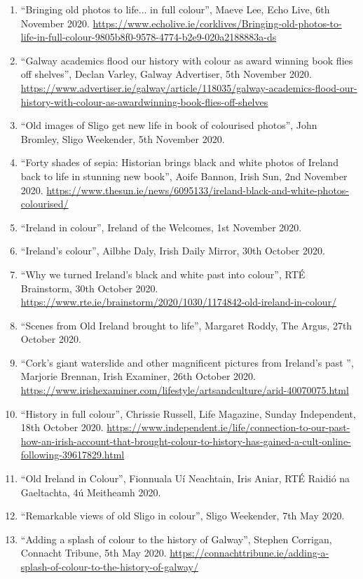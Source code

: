 \documentclass[10pt,a4paper]{res} %
\begin{document}
\begin{resume}
{\begin{enumerate}
\item ``Bringing old photos to life... in full colour'', Maeve Lee, Echo Live, 6th November 2020. \url{https://www.echolive.ie/corklives/Bringing-old-photos-to-life-in-full-colour-9805b8f0-9578-4774-b2e9-020a2188883a-ds}
\item ``Galway academics flood our history with colour as award winning book flies off shelves'', Declan Varley, Galway Advertiser, 5th November 2020. \url{https://www.advertiser.ie/galway/article/118035/galway-academics-flood-our-history-with-colour-as-awardwinning-book-flies-off-shelves}
\item ``Old images of Sligo get new life in book of colourised photos'', John Bromley, Sligo Weekender, 5th November 2020.
\item ``Forty shades of sepia: Historian brings black and white photos of Ireland back to life in stunning new book'', Aoife Bannon, Irish Sun, 2nd November 2020. \url{https://www.thesun.ie/news/6095133/ireland-black-and-white-photos-colourised/}
\item ``Ireland in colour'', Ireland of the Welcomes, 1st November 2020.
\item ``Ireland's colour'', Ailbhe Daly, Irish Daily Mirror, 30th October 2020.
\item ``Why we turned Ireland's black and white past into colour'', RT\'{E} Brainstorm, 30th October 2020. \url{https://www.rte.ie/brainstorm/2020/1030/1174842-old-ireland-in-colour/}
\item ``Scenes from Old Ireland brought to life'', Margaret Roddy, The Argus, 27th October 2020.
\item ``Cork's giant waterslide and other magnificent pictures from Ireland's past '', Marjorie Brennan, Irish Examiner, 26th October 2020. \url{https://www.irishexaminer.com/lifestyle/artsandculture/arid-40070075.html}
\item ``History in full colour'', Chrissie Russell, Life Magazine, Sunday Independent, 18th October 2020. \url{https://www.independent.ie/life/connection-to-our-past-how-an-irish-account-that-brought-colour-to-history-has-gained-a-cult-online-following-39617829.html}
\item ``Old Ireland in Colour'', Fionnuala U\'{i} Neachtain, Iris Aniar, RT\'{E} Raidi\'{o} na Gaeltachta, 4\'{u} Meitheamh 2020.
\item ``Remarkable views of old Sligo in colour'', Sligo Weekender, 7th May 2020.
\item ``Adding a splash of colour to the history of Galway'', Stephen Corrigan, Connacht Tribune, 5th May 2020. \url{https://connachttribune.ie/adding-a-splash-of-colour-to-the-history-of-galway/}

\end{enumerate}}
\end{resume}
\end{document}
